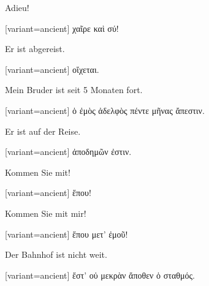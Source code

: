 Adieu!

\switchcolumn

\begin{greek}[variant=ancient]%
χαῖρε καὶ σύ!

\end{greek}%
\switchcolumn*

Er ist abgereist.

\switchcolumn

\begin{greek}[variant=ancient]%
οἴχεται.

\end{greek}%
\switchcolumn*

Mein Bruder ist seit 5 Monaten fort.

\switchcolumn

\begin{greek}[variant=ancient]%
ὁ ἐμὸς ἀδελφὸς πέντε μῆνας ἄπεστιν.

\end{greek}%
\switchcolumn*

Er ist auf der Reise.

\switchcolumn

\begin{greek}[variant=ancient]%
ἀποδημῶν ἐστιν.

\end{greek}%
\indent Kommen Sie mit!

\switchcolumn

\begin{greek}[variant=ancient]%
ἕπου!

\end{greek}%
\switchcolumn*

Kommen Sie mit mir!

\switchcolumn

\begin{greek}[variant=ancient]%
ἕπου μετ' ἐμοῦ!

\end{greek}%
\switchcolumn*

Der Bahnhof ist nicht weit.

\switchcolumn

\begin{greek}[variant=ancient]%
ἔστ' οὐ μεκρὰν ἄποθεν ὁ σταθμός.

\end{greek}%
\switchcolumn*

